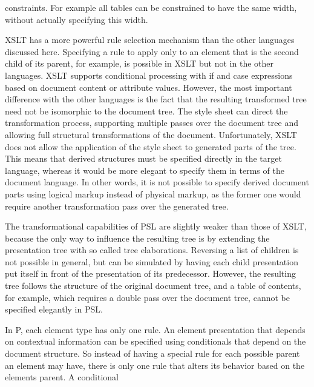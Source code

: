         constraints. For example all tables can be constrained to have the same width,
        without actually specifying this width.
\par {} XSLT has a more powerful rule selection
        mechanism than the other languages discussed here. Specifying a rule to apply
        only to an element that is the second child of its parent, for example, is
        possible in XSLT but not in the other languages. XSLT supports conditional
        processing with if and case expressions based on document content or attribute
        values. However, the most important difference with the other languages is the
        fact that the resulting transformed tree need not be isomorphic to the document
        tree. The style sheet can direct the transformation process, supporting
        multiple passes over the document tree and allowing full structural
        transformations of the document. Unfortunately, XSLT does not allow the
        application of the style sheet to generated parts of the tree. This means that
        derived structures must be specified directly in the target language, whereas
        it would be more elegant to specify them in terms of the document language. In
        other words, it is not possible to specify derived document parts using logical
        markup instead of physical markup, as the former one would require another
        transformation pass over the generated tree.
\par {} The transformational capabilities of PSL
        are slightly weak\-er than those of XSLT, because the only way to influence the
        resulting tree is by extending the presentation tree with so called tree
        elaborations. Reversing a list of children is not possible in general, but can
        be simulated by having each child presentation put itself in front of the
        presentation of its predecessor. However, the resulting tree follows the
        structure of the original document tree, and a table of contents, for example,
        which requires a double pass over the document tree, cannot be specified
        elegantly in PSL.
\par {} In P, each element type has only one rule.
        An element presentation that depends on contextual information can be specified
        using conditionals that depend on the document structure. So instead of having
        a special rule for each possible parent an element may have, there is only one
        rule that alters its behavior based on the elements parent. A conditional
